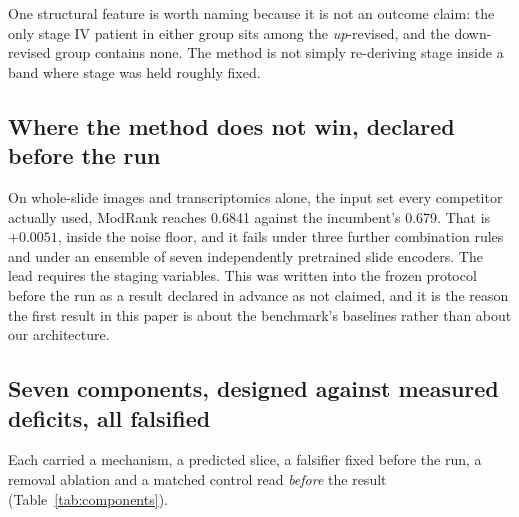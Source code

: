\documentclass[11pt]{article}
\begin{document}
One structural feature is worth naming because it is not an outcome claim: the only stage IV patient
in either group sits among the \emph{up}-revised, and the down-revised group contains none. The
method is not simply re-deriving stage inside a band where stage was held roughly fixed.


\subsection{Where the method does not win, declared before the run}

On whole-slide images and transcriptomics alone, the input set every competitor actually used, ModRank reaches 0.6841 against the incumbent's 0.679. That is $+0.0051$, inside the
noise floor, and it fails under three further combination rules and under an ensemble of seven
independently pretrained slide encoders. The lead requires the staging variables. This was
written into the frozen protocol before the run as a result declared in advance as not claimed,
and it is the reason the first result in this paper is about the benchmark's baselines rather than
about our architecture.

\subsection{Seven components, designed against measured deficits, all falsified}

Each carried a mechanism, a predicted slice, a falsifier fixed before the run, a removal ablation
and a matched control read \emph{before} the result (Table~\ref{tab:components}).
\end{document}
